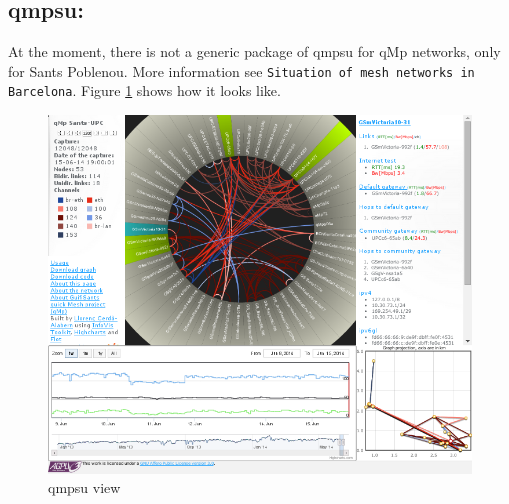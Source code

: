 \documentclass[11pt]{article}
\begin{document}
\subsection{\textbf{qmpsu}:}
\label{sec-11-3}
At the moment, there is not a generic package of qmpsu for qMp networks,
only for Sants Poblenou. More information see
\texttt{Situation of mesh networks in Barcelona}. Figure \ref{fig:qmpsu} shows how it
looks like.

\begin{figure}[htb]
\centering
\includegraphics[width=.9\linewidth]{./img/general/qmpsu.png}
\caption{\label{fig:qmpsu}qmpsu view}
\end{figure}
\end{document}

